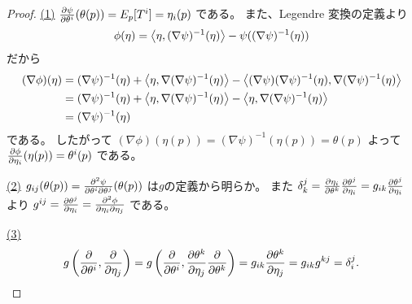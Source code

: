 \documentclass[report]{jlreq}
\begin{document}
\begin{proof}
    \uline{(1)} \quad
    $\deldel[\psi]{\theta^i}(\theta(p)) = E_p[T^i] = \eta_i(p)$
    である。
    また、Legendre 変換の定義より
    \begin{equation}
        \phi(\eta)
            =
                \left\langle{\eta},{(\nabla \psi)^{-1}(\eta)}\right\rangle
                - \psi((\nabla \psi)^{-1}(\eta))
    \end{equation}
    だから
    \begin{alignat}{1}
        (\nabla \phi)(\eta)
            &=
                (\nabla \psi)^{-1}(\eta)
                + \left\langle{
                    \eta
                },{
                    \nabla
                    (\nabla \psi)^{-1}
                    (\eta)
                }\right\rangle
                - \left\langle{
                    (\nabla \psi)
                    (\nabla \psi)^{-1}
                    (\eta)
                },{
                    \nabla
                    (\nabla \psi)^{-1}
                    (\eta)
                }\right\rangle
                \\
            &=
                (\nabla \psi)^{-1}(\eta)
                + \left\langle{
                    \eta
                },{
                    \nabla
                    (\nabla \psi)^{-1}
                    (\eta)
                }\right\rangle
                - \left\langle{
                    \eta
                },{
                    \nabla
                    (\nabla \psi)^{-1}
                    (\eta)
                }\right\rangle
                \\
            &=
                (\nabla \psi)^{-1}
                (\eta)
    \end{alignat}
    である。
    したがって
    $(\nabla \phi)(\eta(p)) = (\nabla \psi)^{-1}(\eta(p)) = \theta(p)$
    よって
    $\deldel[\phi]{\eta_i}(\eta(p)) = \theta^i(p)$
    である。

    \uline{(2)} \quad
    $g_{ij}(\theta(p)) = \frac{\partial^2 \psi}{\partial \theta^i \partial \theta^j}(\theta(p))$
    は$g$の定義から明らか。
    また
    $\delta^j_k
        = \deldel[\eta_i]{\theta^k} \deldel[\theta^j]{\eta_i}
        = g_{ik} \deldel[\theta^j]{\eta_i}$
    より
    $g^{ij}
        = \deldel[\theta^j]{\eta_i}
        = \frac{\del^2 \phi}{\del \eta_i \del \eta_j}$
    である。

    \uline{(3)} \quad
    \begin{alignat}{1}
        g\myparen{
            \deldel{\theta^i},
            \deldel{\eta_j}
        }
            =
                g\myparen{
                    \deldel{\theta^i},
                    \deldel[\theta^k]{\eta_j}
                    \deldel{\theta^k}
                }
            =
                g_{ik} \deldel[\theta^k]{\eta_j}
            =
                g_{ik} g^{kj}
            =
                \delta_i^j.
    \end{alignat}
\end{proof}
\end{document}
